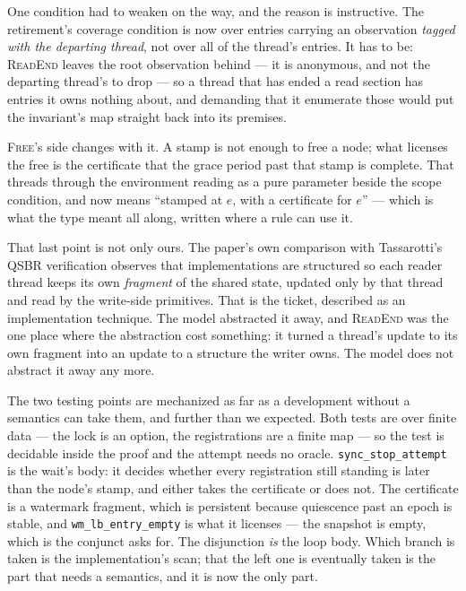 One condition had to weaken on the way, and the reason is instructive.  The
retirement's coverage condition is now over entries carrying an observation
\emph{tagged with the departing thread}, not over all of the thread's entries.
It has to be: \textsc{ReadEnd} leaves the root observation behind --- it is
anonymous, and not the departing thread's to drop --- so a thread that has ended
a read section has entries it owns nothing about, and demanding that it
enumerate those would put the invariant's map straight back into its premises.

\textsc{Free}'s side changes with it.  A stamp is not enough to free a node;
what licenses the free is the certificate that the grace period past that stamp
is complete.  That threads through the environment reading as a pure parameter
beside the scope condition, and \frbl{} now means ``stamped at $e$, with a
certificate for $e$'' --- which is what the type meant all along, written where
a rule can use it.



That last point is not only ours.  The paper's own comparison with Tassarotti's
QSBR verification observes that implementations are structured so each reader
thread keeps its own \emph{fragment} of the shared state, updated only by that
thread and read by the write-side primitives.  That is the ticket, described as
an implementation technique.  The model abstracted it away, and \textsc{ReadEnd}
was the one place where the abstraction cost something: it turned a thread's
update to its own fragment into an update to a structure the writer owns.  The
model does not abstract it away any more.

The two testing points are mechanized as far as a development without a
semantics can take them, and further than we expected.  Both tests are over
finite data --- the lock is an option, the registrations are a finite map --- so
the test is decidable inside the proof and the attempt needs no oracle.
\texttt{sync\_stop\_attempt} is the wait's body: it decides whether every
registration still standing is later than the node's stamp, and either takes the
certificate or does not.  The certificate is a watermark fragment, which is
persistent because quiescence past an epoch is stable, and
\texttt{wm\_lb\_entry\_empty} is what it licenses --- the snapshot is empty,
which is the conjunct \frbl{} asks for.  The disjunction \emph{is} the loop
body.  Which branch is taken is the implementation's scan; that the left one is
eventually taken is the part that needs a semantics, and it is now the only
part.

